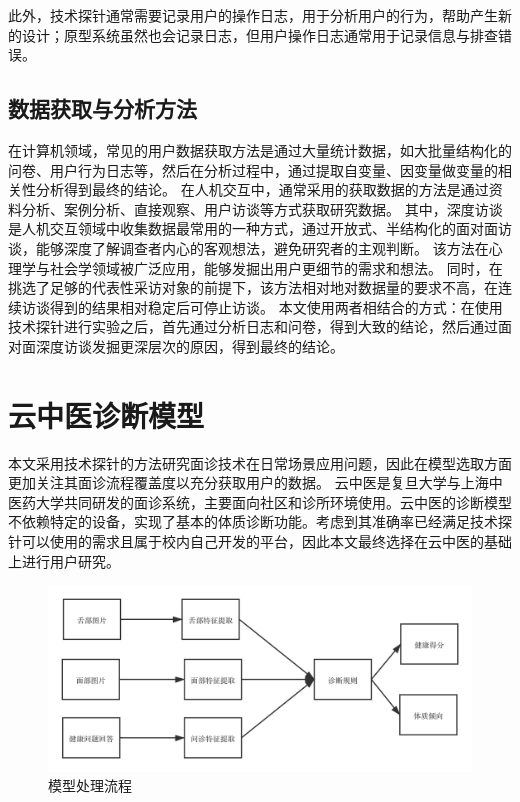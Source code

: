 此外，技术探针通常需要记录用户的操作日志，用于分析用户的行为，帮助产生新的设计；原型系统虽然也会记录日志，但用户操作日志通常用于记录信息与排查错误。

\subsection{数据获取与分析方法}
在计算机领域，常见的用户数据获取方法是通过大量统计数据，如大批量结构化的问卷、用户行为日志等，然后在分析过程中，通过提取自变量、因变量做变量的相关性分析得到最终的结论。
在人机交互中，通常采用的获取数据的方法是通过资料分析、案例分析、直接观察、用户访谈等方式获取研究数据。
其中，深度访谈是人机交互领域中收集数据最常用的一种方式，通过开放式、半结构化的面对面访谈，能够深度了解调查者内心的客观想法，避免研究者的主观判断。
该方法在心理学与社会学领域被广泛应用，能够发掘出用户更细节的需求和想法。
同时，在挑选了足够的代表性采访对象的前提下，该方法相对地对数据量的要求不高，在连续访谈得到的结果相对稳定后可停止访谈\cite{cleary2014data}。
本文使用两者相结合的方式：在使用技术探针进行实验之后，首先通过分析日志和问卷，得到大致的结论，然后通过面对面深度访谈发掘更深层次的原因，得到最终的结论。

\section{云中医诊断模型}
本文采用技术探针的方法研究面诊技术在日常场景应用问题，因此在模型选取方面更加关注其面诊流程覆盖度以充分获取用户的数据。
云中医是复旦大学与上海中医药大学共同研发的面诊系统，主要面向社区和诊所环境使用。云中医的诊断模型不依赖特定的设备，实现了基本的体质诊断功能。考虑到其准确率已经满足技术探针可以使用的需求且属于校内自己开发的平台，因此本文最终选择在云中医的基础上进行用户研究。

\begin{figure}[htb]
    \centering
    \includegraphics[width=15cm]{images/cloud_med3.png}
    \caption{模型处理流程}
    \label{fig:cloudmed1}
\end{figure}

